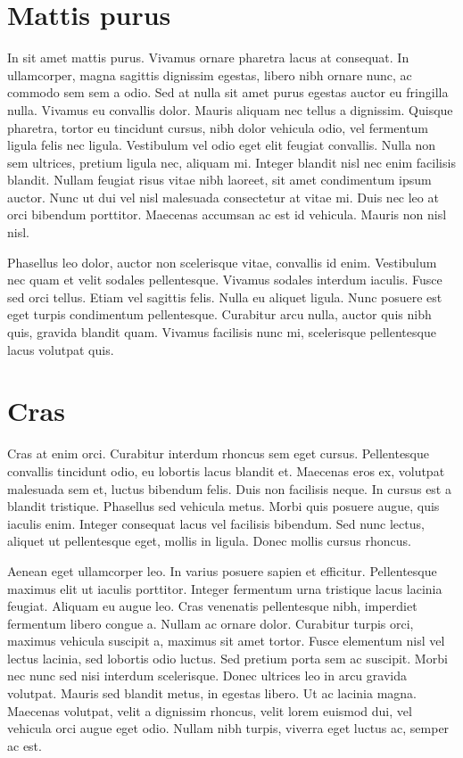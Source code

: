 \chapter{Mattis purus}

In sit amet mattis purus. Vivamus ornare pharetra lacus at consequat. In ullamcorper, magna sagittis dignissim egestas, libero nibh ornare nunc, ac commodo sem sem a odio. Sed at nulla sit amet purus egestas auctor eu fringilla nulla. Vivamus eu convallis dolor. Mauris aliquam nec tellus a dignissim. Quisque pharetra, tortor eu tincidunt cursus, nibh dolor vehicula odio, vel fermentum ligula felis nec ligula. Vestibulum vel odio eget elit feugiat convallis. Nulla non sem ultrices, pretium ligula nec, aliquam mi. Integer blandit nisl nec enim facilisis blandit. Nullam feugiat risus vitae nibh laoreet, sit amet condimentum ipsum auctor. Nunc ut dui vel nisl malesuada consectetur at vitae mi. Duis nec leo at orci bibendum porttitor. Maecenas accumsan ac est id vehicula. Mauris non nisl nisl.

Phasellus leo dolor, auctor non scelerisque vitae, convallis id enim. Vestibulum nec quam et velit sodales pellentesque. Vivamus sodales interdum iaculis. Fusce sed orci tellus. Etiam vel sagittis felis. Nulla eu aliquet ligula. Nunc posuere est eget turpis condimentum pellentesque. Curabitur arcu nulla, auctor quis nibh quis, gravida blandit quam. Vivamus facilisis nunc mi, scelerisque pellentesque lacus volutpat quis.

\chapter{Cras}

Cras at enim orci. Curabitur interdum rhoncus sem eget cursus. Pellentesque convallis tincidunt odio, eu lobortis lacus blandit et. Maecenas eros ex, volutpat malesuada sem et, luctus bibendum felis. Duis non facilisis neque. In cursus est a blandit tristique. Phasellus sed vehicula metus. Morbi quis posuere augue, quis iaculis enim. Integer consequat lacus vel facilisis bibendum. Sed nunc lectus, aliquet ut pellentesque eget, mollis in ligula. Donec mollis cursus rhoncus.

Aenean eget ullamcorper leo. In varius posuere sapien et efficitur. Pellentesque maximus elit ut iaculis porttitor. Integer fermentum urna tristique lacus lacinia feugiat. Aliquam eu augue leo. Cras venenatis pellentesque nibh, imperdiet fermentum libero congue a. Nullam ac ornare dolor. Curabitur turpis orci, maximus vehicula suscipit a, maximus sit amet tortor. Fusce elementum nisl vel lectus lacinia, sed lobortis odio luctus. Sed pretium porta sem ac suscipit. Morbi nec nunc sed nisi interdum scelerisque. Donec ultrices leo in arcu gravida volutpat. Mauris sed blandit metus, in egestas libero. Ut ac lacinia magna. Maecenas volutpat, velit a dignissim rhoncus, velit lorem euismod dui, vel vehicula orci augue eget odio. Nullam nibh turpis, viverra eget luctus ac, semper ac est.


